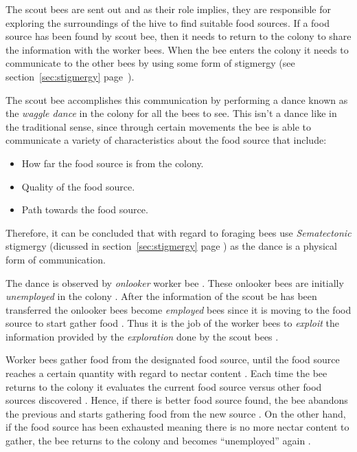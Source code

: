 The scout bees are sent out and as their role implies, they are responsible for exploring the surroundings of the hive to find suitable food sources\cite{ABCCompareStudy}. If a food source has been found by scout bee, then it needs to return to the colony to share the information with the worker bees\cite{ABCCompareStudy}. When the bee enters the colony it needs to communicate to the other bees by using some form of stigmergy (see section~\ref{sec:stigmergy} page~\pageref{def:stigmergy})\cite{ABCCompareStudy}.

The scout bee accomplishes this communication by performing a dance known as the \emph{waggle dance} in the colony for all the bees to see\cite{ABCCompareStudy}. This isn't a dance like in the traditional sense, since through certain movements the bee is able to communicate a variety of characteristics about the food source that include\cite{ABCCompareStudy}:
\begin{itemize}
\item How far the food source is from the colony.
\item Quality of the food source.
\item Path towards the food source.
\end{itemize}

Therefore, it can be concluded that with regard to foraging bees use \emph{Sematectonic} stigmergy (dicussed in section~\ref{sec:stigmergy} page \pageref{def:sematectonic}) as the dance is a physical form of communication.

The dance is observed by \emph{onlooker} worker bee \cite{ABCCompareStudy,ABCImageEnhancement}. These onlooker bees are initially \emph{unemployed} in the colony \cite{ABCCompareStudy,ABCImageEnhancement}. After the information of the scout be has been transferred the onlooker bees become \emph{employed} bees since it is moving to the food source to start gather food \cite{ABCCompareStudy,ABCImageEnhancement}. Thus it is the job of the worker bees to \emph{exploit} the information provided by the \emph{exploration} done by the scout bees \cite{ABCCompareStudy,ABCNumericalOptimization}. 

Worker bees gather food from the designated food source, until the food source reaches a certain quantity with regard to nectar content \cite{ABCCompareStudy,ABCNumericalOptimization}. Each time the bee returns to the colony it evaluates the current food source versus other food sources discovered \cite{ABCCompareStudy,ABCNumericalOptimization}. Hence, if there is better food source found, the bee abandons the previous and starts gathering food from the new source \cite{ABCCompareStudy,ABCNumericalOptimization}. On the other hand, if the food source has been exhausted meaning there is no more nectar content to gather, the bee returns to the colony and becomes ``unemployed'' again \cite{ABCCompareStudy,ABCNumericalOptimization}.

